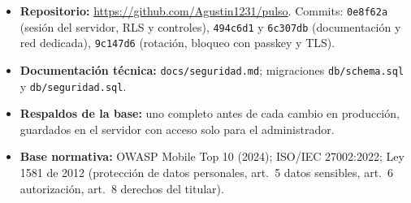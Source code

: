\documentclass[11pt,letterpaper]{article}
\newcommand{\cod}[1]{\texttt{#1}}
\begin{document}
\small
\begin{itemize}
  \item \textbf{Repositorio:} \url{https://github.com/Agustin1231/pulso}. Commits: \cod{0e8f62a} (sesión del servidor, RLS y controles), \cod{494c6d1} y \cod{6c307db} (documentación y red dedicada), \cod{9c147d6} (rotación, bloqueo con passkey y TLS).
  \item \textbf{Documentación técnica:} \cod{docs/seguridad.md}; migraciones \cod{db/schema.sql} y \cod{db/seguridad.sql}.
  \item \textbf{Respaldos de la base:} uno completo antes de cada cambio en producción, guardados en el servidor con acceso solo para el administrador.
  \item \textbf{Base normativa:} OWASP Mobile Top 10 (2024); ISO/IEC 27002:2022; Ley 1581 de 2012 (protección de datos personales, art.~5 datos sensibles, art.~6 autorización, art.~8 derechos del titular).
\end{itemize}
\end{document}
